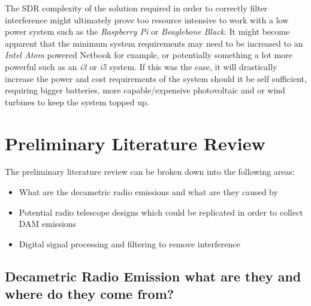 \documentclass[runningheads,a4paper]{llncs}
\begin{document}
The \gls{SDR} complexity of the solution required in order to correctly filter interference might ultimately prove too resource intensive to work with a low power system such as the \textit{Raspberry Pi} or \textit{Beaglebone Black}. It might become apparent that the minimum system requirements may need to be increased to an \textit{Intel Atom} powered Netbook for example, or potentially something a lot more powerful such as an \textit{i3} or \textit{i5} system. If this was the case, it will drastically increase the power and cost requirements of the system should it be self sufficient, requiring bigger batteries, more capable/expensive photovoltaic and or wind turbines to keep the system topped up.


%
%
\newpage
\section*{Preliminary Literature Review}

The preliminary literature review can be broken down into the following areas:


\begin{itemize}
  \item[\textbullet] What are the decametric radio emissions and what are they caused by
  \item[\textbullet] Potential radio telescope designs which could be replicated in order to collect DAM emissions
  \item[\textbullet] Digital signal processing and filtering to remove interference
\end{itemize}

\subsection*{Decametric Radio Emission what are they and where do they come from?}
\end{document}
